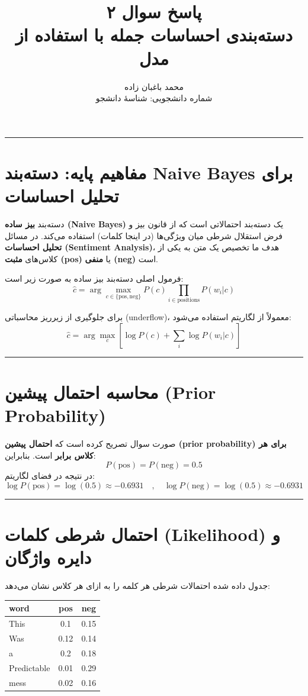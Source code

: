 \documentclass[11pt,a4paper]{article}
\title{\textbf{پاسخ سوال ۲} \\[0.4cm] \footnotesize دسته‌بندی احساسات جمله با استفاده از مدل \en{Naive Bayes}}
\author{محمد باغبان زاده \\ شماره دانشجویی: شناسهٔ دانشجو}
\date{}
\newcommand{\en}[1]{\textenglish{#1}}
\newcommand{\separator}{\vspace{1em}\noindent\rule{\linewidth}{0.4pt}\vspace{1em}}
\newcommand{\thickseparator}{\vspace{1em}\noindent\rule{\linewidth}{1pt}\vspace{1em}}
\begin{document}
\maketitle
\thickseparator

\section{مفاهیم پایه: دسته‌بند \en{Naive Bayes} برای تحلیل احساسات}
دسته‌بند \textbf{بیز ساده (\en{Naive Bayes})} یک دسته‌بند احتمالاتی است که از قانون بیز و فرض استقلال شرطی میان ویژگی‌ها (در اینجا کلمات) استفاده می‌کند. در مسائل \textbf{تحلیل احساسات (\en{Sentiment Analysis})}، هدف ما تخصیص یک متن به یکی از کلاس‌های \textbf{مثبت (\en{pos})} یا \textbf{منفی (\en{neg})} است.

فرمول اصلی دسته‌بند بیز ساده به صورت زیر است:
\[
\hat{c} = \arg\max_{c \in \{\text{pos},\text{neg}\}} P(c) \prod_{i \in \text{positions}} P(w_i | c)
\]

برای جلوگیری از زیرریز محاسباتی (\en{underflow})، معمولاً از لگاریتم استفاده می‌شود:
\[
\hat{c} = \arg\max_{c} \left[ \log P(c) + \sum_{i} \log P(w_i | c) \right]
\]

\separator
\section{محاسبه احتمال پیشین (\en{Prior Probability})}
صورت سوال تصریح کرده است که \textbf{احتمال پیشین (\en{prior probability}) برای هر کلاس برابر} است. بنابراین:
\[
P(\text{pos}) = P(\text{neg}) = 0.5
\]
در نتیجه در فضای لگاریتم:
\[
\log P(\text{pos}) = \log(0.5) \approx -0.6931 \quad , \quad \log P(\text{neg}) = \log(0.5) \approx -0.6931
\]

\separator
\section{احتمال شرطی کلمات (\en{Likelihood}) و دایره واژگان}
جدول داده شده احتمالات شرطی هر کلمه را به ازای هر کلاس نشان می‌دهد:

\begin{center}
\begin{tabular}{|l|c|c|}
\hline
\textbf{\en{word}} & \textbf{\en{pos}} & \textbf{\en{neg}} \\
\hline
\en{This} & 0.1 & 0.15 \\
\hline
\en{Was} & 0.12 & 0.14 \\
\hline
\en{a} & 0.2 & 0.18 \\
\hline
\en{Predictable} & 0.01 & 0.29 \\
\hline
\en{mess} & 0.02 & 0.16 \\
\hline
\end{tabular}
\end{center}
\end{document}
